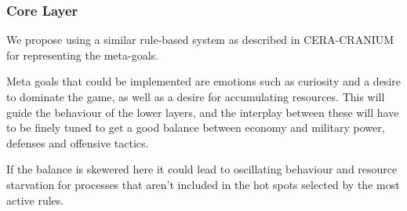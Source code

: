 \subsubsection{Core Layer}
We propose using a similar rule-based system as described in CERA-CRANIUM for
representing the meta-goals.

Meta goals that could be implemented are emotions such as curiosity and a
desire to dominate the game, as well as a desire for accumulating resources.
This will guide the behaviour of the lower layers, and the interplay between
these will have to be finely tuned to get a good balance between economy and
military power, defenses and offensive tactics.

If the balance is skewered here it could lead to oscillating behaviour and
resource starvation for processes that aren't included in the hot spots
selected by the most active rules.